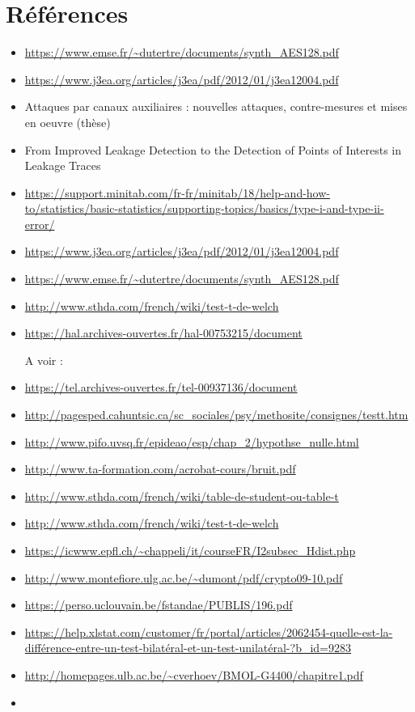 \documentclass[10pt, oneside, a4paper]{article}
\begin{document}
\section*{Références}

\begin{itemize}
\item \url{https://www.emse.fr/~dutertre/documents/synth_AES128.pdf}
\item \url{https://www.j3ea.org/articles/j3ea/pdf/2012/01/j3ea12004.pdf}
\item Attaques par canaux auxiliaires : nouvelles attaques, contre-mesures et mises en oeuvre (thèse)
\item From Improved Leakage Detection to the Detection of Points of Interests in Leakage Traces
\item \url{https://support.minitab.com/fr-fr/minitab/18/help-and-how-to/statistics/basic-statistics/supporting-topics/basics/type-i-and-type-ii-error/}
\item \url{https://www.j3ea.org/articles/j3ea/pdf/2012/01/j3ea12004.pdf}
\item \url{https://www.emse.fr/~dutertre/documents/synth_AES128.pdf}
\item \url{http://www.sthda.com/french/wiki/test-t-de-welch}
\item \url{https://hal.archives-ouvertes.fr/hal-00753215/document}

A voir :
\item \url{https://tel.archives-ouvertes.fr/tel-00937136/document}
\item \url{http://pagesped.cahuntsic.ca/sc_sociales/psy/methosite/consignes/testt.htm}
\item \url{http://www.pifo.uvsq.fr/epideao/esp/chap_2/hypothse_nulle.html}
\item \url{http://www.ta-formation.com/acrobat-cours/bruit.pdf}
\item \url{http://www.sthda.com/french/wiki/table-de-student-ou-table-t}
\item \url{http://www.sthda.com/french/wiki/test-t-de-welch}
\item \url{https://icwww.epfl.ch/~chappeli/it/courseFR/I2subsec_Hdist.php}
\item \url{http://www.montefiore.ulg.ac.be/~dumont/pdf/crypto09-10.pdf}
\item \url{https://perso.uclouvain.be/fstandae/PUBLIS/196.pdf}
\item \url{https://help.xlstat.com/customer/fr/portal/articles/2062454-quelle-est-la-différence-entre-un-test-bilatéral-et-un-test-unilatéral-?b_id=9283}
\item \url{http://homepages.ulb.ac.be/~cverhoev/BMOL-G4400/chapitre1.pdf}
\item \url{}
\end{itemize}
\end{document}
